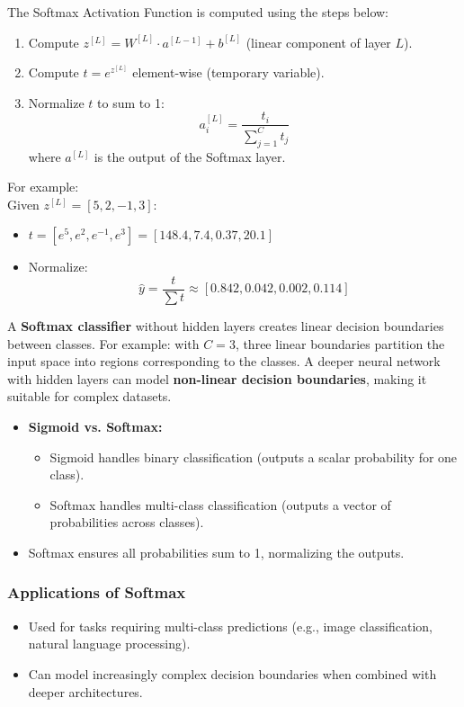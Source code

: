 \documentclass[letterpaper,12pt,notitlepage,twoside]{report}
\begin{document}
The Softmax Activation Function is computed using the steps below:
\begin{enumerate}[noitemsep, topsep=0pt]
    \item Compute $z^{[L]} = W^{[L]} \cdot a^{[L-1]} + b^{[L]}$ (linear component of layer $L$).
    \item Compute $t = e^{z^{[L]}}$ element-wise (temporary variable).
    \item Normalize $t$ to sum to 1:
    \[
    a^{[L]}_i = \frac{t_i}{\sum_{j=1}^{C} t_j}
    \]
    where $a^{[L]}$ is the output of the Softmax layer.
\end{enumerate}

For example: \\
Given $z^{[L]} = [5, 2, -1, 3]$:
\begin{itemize}
    \item $t = [e^5, e^2, e^{-1}, e^3] = [148.4, 7.4, 0.37, 20.1]$
    \item Normalize: 
    \[
    \hat{y} = \frac{t}{\sum t} \approx [0.842, 0.042, 0.002, 0.114]
    \]
\end{itemize}

A \textbf{Softmax classifier} without hidden layers creates linear decision boundaries between classes. For example: with $C = 3$, three linear boundaries partition the input space into regions corresponding to the classes. A deeper neural network with hidden layers can model \textbf{non-linear decision boundaries}, making it suitable for complex datasets.

\begin{itemize}
    \item \textbf{Sigmoid vs. Softmax:}
    \begin{itemize}
        \item Sigmoid handles binary classification (outputs a scalar probability for one class).
        \item Softmax handles multi-class classification (outputs a vector of probabilities across classes).
    \end{itemize}
    \item Softmax ensures all probabilities sum to 1, normalizing the outputs.
\end{itemize}

\subsubsection{Applications of Softmax}
\begin{itemize}
    \item Used for tasks requiring multi-class predictions (e.g., image classification, natural language processing).
    \item Can model increasingly complex decision boundaries when combined with deeper architectures.
\end{itemize}
\end{document}
